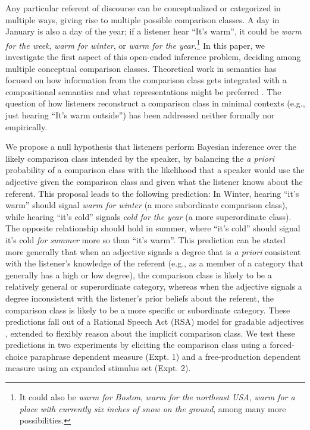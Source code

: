 \documentclass[doc]{apa6}
\begin{document}
Any particular referent of discourse can be conceptualized or categorized in
multiple ways, giving rise to multiple possible comparison classes. A day in
January is also a day of the year; if a listener hear ``It's
warm'', it could be \emph{warm for the week}, \emph{warm for winter}, or
\emph{warm for the year}.\footnote{It could also be \emph{warm for
  Boston}, \emph{warm for the northeast USA}, \emph{warm for a place
  with currently six inches of snow on the ground}, among many more
  possibilities. } In this paper, we investigate the first aspect of
this open-ended inference problem, deciding among multiple conceptual comparison
classes. Theoretical work in semantics has focused on how information
from the comparison class gets integrated with a compositional semantics
and what representations might be preferred \cite{Bale2011, Solt2009}.
The question of how listeners reconstruct a comparison class in
minimal contexts (e.g., just hearing ``It's warm outside'')
has been addressed neither formally nor empirically.

We propose a null hypothesis that listeners perform Bayesian inference over the likely comparison class intended by the speaker, by balancing the \emph{a priori} probability of a comparison class with the likelihood that a speaker would use the adjective given the comparison class and given what the listener knows about the referent. 
This proposal leads to the following prediction: In Winter, hearing ``it's warm'' should signal \emph{warm for
winter} (a more subordinate comparison class), while hearing ``it's cold'' signals \emph{cold for the
year} (a more superordinate class). The opposite relationship should hold in summer, where
``it's cold'' should signal it's cold \emph{for summer} more so
than ``it's warm''. This prediction can be stated more generally that when an adjective signals a degree that is \emph{a priori} consistent with  the listener's knowledge of the referent (e.g., as a member of a category that generally has a high or low degree), the comparison class is likely to be a relatively general or superordinate category, whereas when the adjective signals a degree inconsistent with the listener's prior beliefs about the referent, the comparison class is likely to be a more specific or subordinate category. 
These predictions fall out of a Rational Speech Act (RSA) model for gradable
adjectives \cite{Lassiter2013, Lassiter2017}, extended to flexibly
reason about the implicit comparison class. We test these predictions in
two experiments by eliciting the comparison class using a forced-choice
paraphrase dependent measure (Expt. 1) and a free-production dependent
measure using an expanded stimulus set (Expt. 2).
\end{document}
